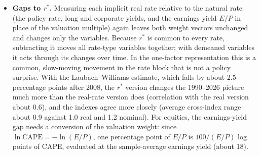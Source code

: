 \documentclass[11pt]{article}
\theoremstyle{definition}
\theoremstyle{remark}
\begin{document}
\begin{itemize}[leftmargin=2em]
\item \textbf{Gaps to $r^*$.} Measuring each implicit real rate relative to the natural rate (the policy rate, long and corporate yields, and the earnings yield $E/P$ in place of the valuation multiple) again leaves both weight vectors unchanged and changes only the variables. Because $r^*$ is common to every rate, subtracting it moves all rate-type variables together; with demeaned variables it acts through its changes over time. In the one-factor representation this is a common, slow-moving movement in the rate block that is not a policy surprise. With the Laubach--Williams estimate, which falls by about 2.5 percentage points after 2008, the $r^*$ version changes the 1990--2026 picture much more than the real-rate version does (correlation with the real version about 0.6), and the indexes agree more closely (average cross-index range about 0.9 against 1.0 real and 1.2 nominal). For equities, the earnings-yield gap needs a conversion of the valuation weight: since $\ln\text{CAPE}=-\ln(E/P)$, one percentage point of $E/P$ is $100/(E/P)$ log points of CAPE, evaluated at the sample-average earnings yield (about 18).
\end{itemize}
\end{document}

